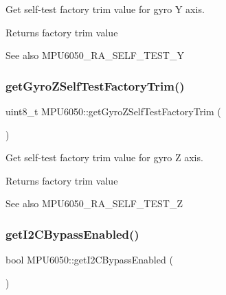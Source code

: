 Get self-\/test factory trim value for gyro Y axis. \begin{DoxyReturn}{Returns}
factory trim value 
\end{DoxyReturn}
\begin{DoxySeeAlso}{See also}
M\+P\+U6050\+\_\+\+R\+A\+\_\+\+S\+E\+L\+F\+\_\+\+T\+E\+S\+T\+\_\+Y 
\end{DoxySeeAlso}
\mbox{\label{class_m_p_u6050_a6aecb64dc804f1238e56626ae13b4c79}} 
\subsubsection{\texorpdfstring{getGyroZSelfTestFactoryTrim()}{getGyroZSelfTestFactoryTrim()}}
{\footnotesize\ttfamily uint8\+\_\+t M\+P\+U6050\+::get\+Gyro\+Z\+Self\+Test\+Factory\+Trim (\begin{DoxyParamCaption}{ }\end{DoxyParamCaption})}

Get self-\/test factory trim value for gyro Z axis. \begin{DoxyReturn}{Returns}
factory trim value 
\end{DoxyReturn}
\begin{DoxySeeAlso}{See also}
M\+P\+U6050\+\_\+\+R\+A\+\_\+\+S\+E\+L\+F\+\_\+\+T\+E\+S\+T\+\_\+Z 
\end{DoxySeeAlso}
\mbox{\label{class_m_p_u6050_aed33db318a770d0020eb8b84058650f3}} 
\subsubsection{\texorpdfstring{getI2CBypassEnabled()}{getI2CBypassEnabled()}}
{\footnotesize\ttfamily bool M\+P\+U6050\+::get\+I2\+C\+Bypass\+Enabled (\begin{DoxyParamCaption}{ }\end{DoxyParamCaption})}

